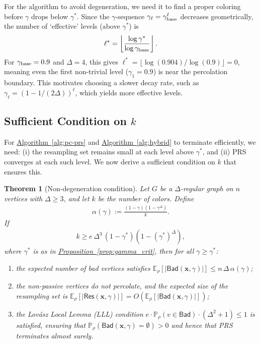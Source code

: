 \documentclass[12pt, a4paper]{article}
\theoremstyle{plain}
\newtheorem{theorem}{Theorem}
\theoremstyle{definition}
\theoremstyle{remark}
\newcommand{\mbb}{\mathbb}
\renewcommand{\v}[1]{\boldsymbol{#1}}
\newcommand{\mx}{\v{x}}
\newcommand{\lt}{\left}
\newcommand{\rt}{\right}
\newcommand{\sref}[2]{\hyperref[#2]{#1~\ref*{#2}}}
\newcommand{\bad}{\mathsf{Bad}}
\newcommand{\res}{\mathsf{Res}}
\begin{document}
For the algorithm to avoid degeneration, we need it to find a proper coloring before \(\gamma\) drops below \(\gamma^*\). Since the \(\gamma\)-sequence \(\gamma_\ell=\gamma_{\rm base}^\ell\) decreases geometrically, the number of `effective' levels (above \(\gamma^*\)) is
\begin{align}\label{eqn:ell_star}
\ell^* = \left\lfloor \frac{\log \gamma^*}{\log \gamma_{\rm base}} \right\rfloor.
\end{align}
For \(\gamma_{\rm base}=0.9\) and \(\Delta=4\), this gives \(\ell^*=\lfloor\log(0.904)/\log(0.9)\rfloor=0\), meaning even the first non-trivial level (\(\gamma_1=0.9\)) is near the percolation boundary. This motivates choosing a slower decay rate, such as \(\gamma_\ell = (1-1/(2\Delta))^\ell\), which yields more effective levels.

\subsection{Sufficient Condition on \(k\)}\label{sec:sufficient-k}

For \sref{Algorithm}{alg:pc-prs} and \sref{Algorithm}{alg:hybrid} to terminate efficiently, we need: (i) the resampling set remains small at each level above \(\gamma^*\), and (ii) PRS converges at each such level. We now derive a sufficient condition on \(k\) that ensures this.

\begin{theorem}[Non-degeneration condition]\label{thm:non-degen}
Let \(G\) be a \(\Delta\)-regular graph on \(n\) vertices with \(\Delta\geq3\), and let \(k\) be the number of colors. Define
\begin{align}
\alpha(\gamma) := \frac{(1-\gamma)(1-\gamma^{\Delta})}{k}.
\end{align}
If
\begin{align}\label{eqn:k_sufficient}
k \geq e\,\Delta^3\,(1-\gamma^*)(1-(\gamma^*)^{\Delta}),
\end{align}
where \(\gamma^*\) is as in \sref{Proposition}{prop:gamma_crit}, then for all \(\gamma\geq\gamma^*\):
\begin{enumerate}[label=(\roman*)]
    \item the expected number of bad vertices satisfies \(\mbb E_\rho[|\bad(\mx,\gamma)|]\leq n\,\Delta\,\alpha(\gamma)\);
    \item the non-passive vertices do not percolate, and the expected size of the resampling set is \(\mbb E_\rho[|\res(\mx,\gamma)|] = O\!\lt(\mbb E_\rho[|\bad(\mx,\gamma)|]\rt)\);
    \item the Lov\'asz Local Lemma (LLL) condition \(e\cdot\mbb P_\rho(v\in\bad)\cdot (\Delta^2+1) \leq 1\) is satisfied, ensuring that \(\mbb P_\rho(\bad(\mx,\gamma)=\emptyset)>0\) and hence that PRS terminates almost surely.
\end{enumerate}
\end{theorem}
\end{document}
